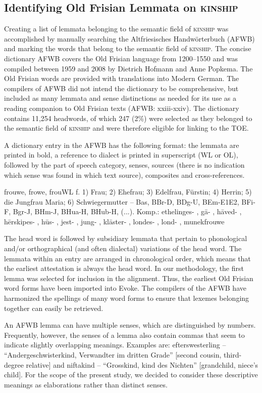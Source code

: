 \subsection{Identifying Old Frisian Lemmata on \textsc{kinship}}
Creating a list of lemmata belonging to the semantic field of \textsc{kinship} was accomplished by manually searching the Altfriesisches Handwörterbuch (AFWB) and marking the words that belong to the semantic field of \textsc{kinship}. The concise dictionary AFWB covers the Old Frisian language from 1200–1550 and was compiled between 1959 and 2008 by Dietrich Hofmann and Anne Popkema. The Old Frisian words are provided with translations into Modern German. The compilers of AFWB did not intend the dictionary to be comprehensive, but included as many lemmata and sense distinctions as needed for its use as a reading companion to Old Frisian texts (AFWB: xxiii-xxiv). The dictionary contains 11,254 headwords, of which 247 (2\%) were selected as they belonged to the semantic field of \textsc{kinship} and were therefore eligible for linking to the TOE.

A dictionary entry in the AFWB has the following format: the lemmata are printed in bold, a reference to dialect is printed in superscript (WL or OL), followed by the part of speech category, senses, sources (there is no indication which sense was found in which text source), composites and cross-references.

frouwe, frowe, frouWL f. 1) Frau; 2) Ehefrau; 3) Edelfrau, Fürstin; 4) Herrin; 5) die Jungfrau Maria; 6) Schwiegermutter –
Bas, BBr-D, BDg-U, BEm-E1E2, BFi-F, Bgr-J, BHm-J, BHua-H, BHub-H, (...). 
Komp.: ethelinges- , gā- , hāved- , hērskipes- , hūs- , jest- , jung- , klāster- , londes- , lond- , munekfrouwe

The head word is followed by subsidiary lemmata that pertain to phonological and/or orthographical (and often dialectal) variations of the head word. The lemmata within an entry are arranged in chronological order, which means that the earliest attestation is always the head word. In our methodology, the first lemma was selected for inclusion in the alignment. Thus, the earliest Old Frisian word forms have been imported into Evoke. The compilers of the AFWB have harmonized the spellings of many word forms to ensure that lexemes belonging together can easily be retrieved. 

An AFWB lemma can have multiple senses, which are distinguished by numbers. Frequently, however, the senses of a lemma also contain commas that seem to indicate slightly overlapping meanings. Examples are: efterswesterling – “Andergeschwisterkind, Verwandter im dritten Grade” [second cousin, third-degree relative] and niftakind – “Grosskind, kind des Nichten” [grandchild, niece’s child]. For the scope of the present study, we decided to consider these descriptive meanings as elaborations rather than distinct senses.

